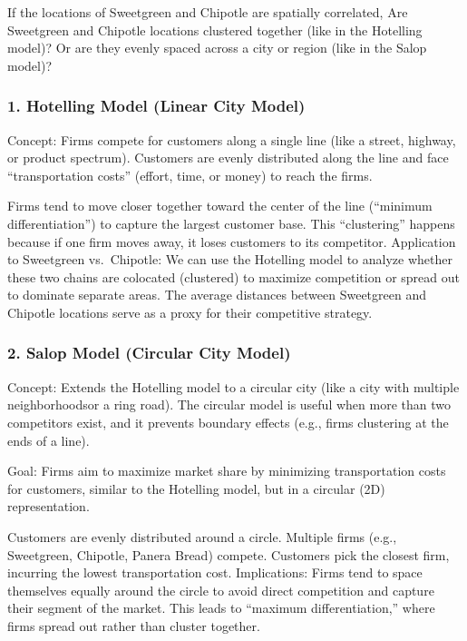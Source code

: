 \documentclass[
  letterpaper,
  DIV=11,
  numbers=noendperiod]{scrartcl}
\begin{document}
If the locations of Sweetgreen and Chipotle are spatially correlated,
Are Sweetgreen and Chipotle locations clustered together (like in the
Hotelling model)? Or are they evenly spaced across a city or region
(like in the Salop model)?

\subsubsection{1. Hotelling Model (Linear City
Model)}\label{hotelling-model-linear-city-model}

Concept: Firms compete for customers along a single line (like a street,
highway, or product spectrum). Customers are evenly distributed along
the line and face ``transportation costs'' (effort, time, or money) to
reach the firms.

Firms tend to move closer together toward the center of the line
(``minimum differentiation'') to capture the largest customer base. This
``clustering'' happens because if one firm moves away, it loses
customers to its competitor. Application to Sweetgreen vs.~Chipotle: We
can use the Hotelling model to analyze whether these two chains are
colocated (clustered) to maximize competition or spread out to dominate
separate areas. The average distances between Sweetgreen and Chipotle
locations serve as a proxy for their competitive strategy.

\subsubsection{2. Salop Model (Circular City
Model)}\label{salop-model-circular-city-model}

Concept: Extends the Hotelling model to a circular city (like a city
with multiple neighborhoodsor a ring road). The circular model is useful
when more than two competitors exist, and it prevents boundary effects
(e.g., firms clustering at the ends of a line).

Goal: Firms aim to maximize market share by minimizing transportation
costs for customers, similar to the Hotelling model, but in a circular
(2D) representation.

Customers are evenly distributed around a circle. Multiple firms (e.g.,
Sweetgreen, Chipotle, Panera Bread) compete. Customers pick the closest
firm, incurring the lowest transportation cost. Implications: Firms tend
to space themselves equally around the circle to avoid direct
competition and capture their segment of the market. This leads to
``maximum differentiation,'' where firms spread out rather than cluster
together.
\end{document}
